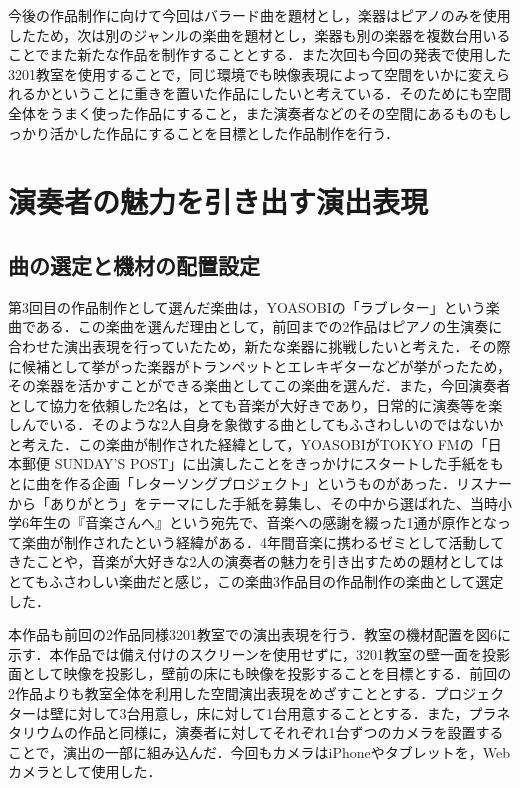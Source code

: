 今後の作品制作に向けて今回はバラード曲を題材とし，楽器はピアノのみを使用したため，次は別のジャンルの楽曲を題材とし，楽器も別の楽器を複数台用いることでまた新たな作品を制作することとする．また次回も今回の発表で使用した3201教室を使用することで，同じ環境でも映像表現によって空間をいかに変えられるかということに重きを置いた作品にしたいと考えている．そのためにも空間全体をうまく使った作品にすること，また演奏者などのその空間にあるものもしっかり活かした作品にすることを目標とした作品制作を行う．


\section{演奏者の魅力を引き出す演出表現}
\subsection{曲の選定と機材の配置設定}
第3回目の作品制作として選んだ楽曲は，YOASOBIの「ラブレター」\cite{loveletter}という楽曲である．この楽曲を選んだ理由として，前回までの2作品はピアノの生演奏に合わせた演出表現を行っていたため，新たな楽器に挑戦したいと考えた．その際に候補として挙がった楽器がトランペットとエレキギターなどが挙がったため，その楽器を活かすことができる楽曲としてこの楽曲を選んだ．また，今回演奏者として協力を依頼した2名は，とても音楽が大好きであり，日常的に演奏等を楽しんでいる．そのような2人自身を象徴する曲としてもふさわしいのではないかと考えた．この楽曲が制作された経緯として，YOASOBIがTOKYO FMの「日本郵便 SUNDAY'S POST」に出演したことをきっかけにスタートした手紙をもとに曲を作る企画「レターソングプロジェクト」\cite{lettersong}というものがあった．リスナーから「ありがとう」をテーマにした手紙を募集し、その中から選ばれた、当時小学6年生の『音楽さんへ』という宛先で、音楽への感謝を綴った1通が原作となって楽曲が制作されたという経緯がある．4年間音楽に携わるゼミとして活動してきたことや，音楽が大好きな2人の演奏者の魅力を引き出すための題材としてはとてもふさわしい楽曲だと感じ，この楽曲3作品目の作品制作の楽曲として選定した．

本作品も前回の2作品同様3201教室での演出表現を行う．教室の機材配置を図6に示す．本作品では備え付けのスクリーンを使用せずに，3201教室の壁一面を投影面として映像を投影し，壁前の床にも映像を投影することを目標とする．前回の2作品よりも教室全体を利用した空間演出表現をめざすこととする．プロジェクターは壁に対して3台用意し，床に対して1台用意することとする．また，プラネタリウムの作品と同様に，演奏者に対してそれぞれ1台ずつのカメラを設置することで，演出の一部に組み込んだ．今回もカメラはiPhoneやタブレットを，Webカメラとして使用した．


